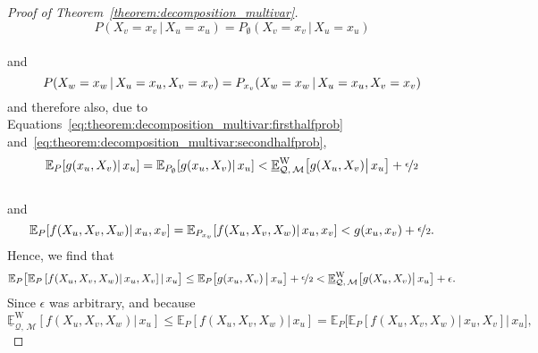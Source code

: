 \documentclass[10pt,a4paper]{paper}
\theoremstyle{definition}
\newcommand{\states}{\mathcal{X}}
\newcommand{\rateset}{\mathcal{Q}}
\begin{document}
\begin{proof}[Proof of Theorem~\ref{theorem:decomposition_multivar}]
\begin{equation*}
P(X_v=x_v\,\vert\,X_u=x_u) = P_\emptyset(X_v=x_v\,\vert\,X_u=x_u)
\end{equation*}\\[-20pt]
and
\begin{equation*}
P(X_w=x_w\,\vert\,X_u=x_u,X_v=x_v) = P_{x_v}(X_w=x_w\,\vert\,X_u=x_u,X_v=x_v)\vspace{6pt}
\end{equation*}
and therefore also, due to Equations~\eqref{eq:theorem:decomposition_multivar:firsthalfprob} and~\eqref{eq:theorem:decomposition_multivar:secondhalfprob},
\begin{equation*}%
\mathbb{E}_P[g(x_u,X_v)\vert\,x_u]
=\mathbb{E}_{P_\emptyset}[g(x_u,X_v)\vert\,x_u]
< \underline{\mathbb{E}}^{\mathrm{W}}_{\rateset,\,\mathcal{M}}\bigl[g(X_u,X_v)\big\vert\,x_u\bigr]
+\nicefrac{\epsilon}{2}
\end{equation*}\\[-20pt]
and
\begin{equation*}%
\mathbb{E}_P[f(X_u,X_v,X_w)\vert\,x_u,x_v]
=\mathbb{E}_{P_{x_v}}[f(X_u,X_v,X_w)\vert\, x_u,x_v]
<g(x_u,x_v)+\nicefrac{\epsilon}{2}.\vspace{6pt}
\end{equation*}
Hence, we find that
\begin{align*}
\mathbb{E}_P\bigl[\mathbb{E}_P\left[f(X_u,X_v,X_w)\vert\,x_u,X_v\right]\vert\,x_u\bigr]
\leq
\mathbb{E}_P\bigl[g(x_u,X_v)\,\big\vert\,x_u\bigr]+\nicefrac{\epsilon}{2}
< \underline{\mathbb{E}}^{\mathrm{W}}_{\rateset,\,\mathcal{M}}\bigl[g(X_u,X_v)\big\vert\,x_u\bigr]
+\epsilon.
\end{align*}
Since $\epsilon$ was arbitrary, and because
\begin{equation*}
\underline{\mathbb{E}}^{\mathrm{W}}_{\rateset,\,\mathcal{M}}\left[f(X_u,X_v,X_w)\vert\,x_u\right]
\leq
\mathbb{E}_P\left[f(X_u,X_v,X_w)\vert\,x_u\right] = \mathbb{E}_P\bigl[\mathbb{E}_P\left[f(X_u,X_v,X_w)\vert\,x_u,X_v\right]\vert\,x_u\bigr],

\end{equation*}
\end{proof}
\end{document}
